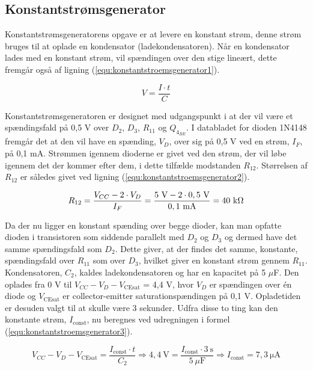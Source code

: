 \subsection*{Konstantstrømsgenerator}
\label{volumenkontrol-design-konstantstroemsgenerator}

Konstantstrømsgeneratorens opgave er at levere en konstant strøm, denne strøm bruges til at oplade en kondensator (ladekondensatoren). Når en kondensator lades med en konstant strøm, vil spændingen over den stige lineært, dette fremgår også af ligning (\ref{equ:konstantstroemsgenerator1}).

\begin{equation}
\label{equ:konstantstroemsgenerator1}
V = \frac{I \cdot t}{C}
\end{equation}

Konstantstrømsgeneratoren er designet med udgangspunkt i at der vil være et spændingsfald på 0,5 V over $D_2$, $D_3$, $R_{11}$ og $Q_{4_{BE}}$. I databladet for dioden 1N4148 \cite{1n4148-datablad} fremgår det at den vil have en spænding, $V_D$, over sig på 0,5 V ved en strøm, $I_F$, på 0,1 mA. Strømmen igennem dioderne er givet ved den strøm, der vil løbe igennem det der kommer efter dem, i dette tilfælde modstanden $R_{12}$. Størrelsen af $R_{12}$ er således givet ved ligning (\ref{equ:konstantstroemsgenerator2}).

\begin{equation}
\label{equ:konstantstroemsgenerator2}
R_{12} = \frac{V_{CC} - 2 \cdot V_D}{I_F} = \mathrm{\frac{5~V - 2 \cdot 0,5~V}{0,1~mA} = 40~k\ohm}
\end{equation}

Da der nu ligger en konstant spænding over begge dioder, kan man opfatte dioden i transistoren som siddende parallelt med $D_2$ og $D_3$ og dermed have det samme spændingsfald som $D_2$. Dette giver, at der findes det samme, konstante, spændingsfald over $R_{11}$ som over $D_3$, hvilket giver en konstant strøm gennem $R_{11}$.
Kondensatoren, $C_2$, kaldes ladekondensatoren og har en kapacitet på 5 $\mu$F.  Den oplades fra 0 V til $V_{CC} - V_D - V_{\mathrm{CEsat}}$ = 4,4 V, hvor $V_D$ er spændingen over én diode og $V_{\mathrm{CEsat}}$ er collector-emitter saturationspændingen på 0,1 V. Opladetiden er desuden valgt til at skulle være 3 sekunder. Udfra disse to ting kan den konstante strøm, $I_{\mathrm{const}}$, nu beregnes ved udregningen i formel (\ref{equ:konstantstroemsgenerator3}).

\begin{equation}
\label{equ:konstantstroemsgenerator3}
V_{CC} - V_D - V_{\mathrm{CEsat}} = \frac{I_{\mathrm{const}} \cdot t}{C_2} \Rightarrow \mathrm{4,4~V} = \frac{I_{\mathrm{const}} \cdot 3~\mathrm{s}}{5~\mu \mathrm{F}} \Rightarrow I_{\mathrm{const}} = \mathrm{7,3~\mu A}
\end{equation}

